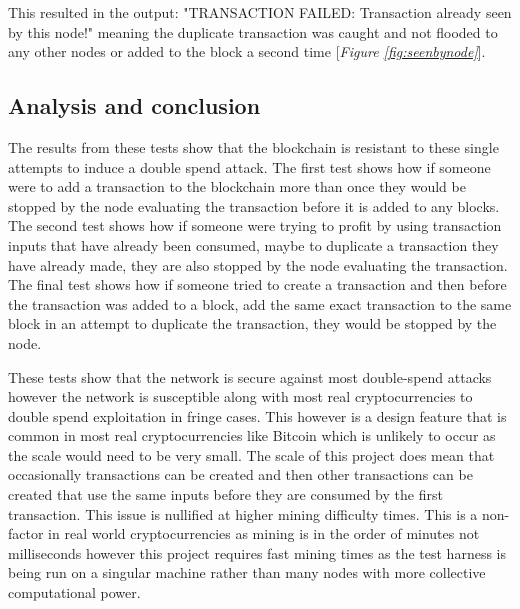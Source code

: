\documentclass{l4proj}
\begin{document}
This resulted in the output: "TRANSACTION FAILED: Transaction already seen by this node!" meaning the duplicate
transaction was caught and not flooded to any other nodes or added to the block a second time [\textit{Figure \ref{fig:seenbynode}}].

\subsection{Analysis and conclusion}
The results from these tests show that the blockchain is resistant to these single attempts to induce a double spend
attack. The first test shows how if someone were to add a transaction to the blockchain more than once they would
be stopped by the node evaluating the transaction before it is added to any blocks. The second test shows how if
someone were trying to profit by using transaction inputs that have already been consumed, maybe to duplicate a
transaction they have already made, they are also stopped by the node evaluating the transaction. The final test
shows how if someone tried to create a transaction and then before the transaction was added to a block, add the same
exact transaction to the same block in an attempt to duplicate the transaction, they would be stopped by the node.

These tests show that the network is secure against most double-spend attacks however the network is susceptible
along with most real cryptocurrencies to double spend exploitation in fringe cases. This however is a design feature
that is common in most real cryptocurrencies like Bitcoin \citep{nakamoto2019bitcoin} which is unlikely to occur as the scale would need to be very small. 
The scale of this project does mean that occasionally transactions can be created and then other transactions
can be created that use the same inputs before they are consumed by the first transaction. This issue is nullified 
at higher mining difficulty times. This is a non-factor in real world cryptocurrencies as mining is in the order of 
minutes not milliseconds however this project requires fast mining times as the test harness is being run on a singular
machine rather than many nodes with more collective computational power.
\end{document}
